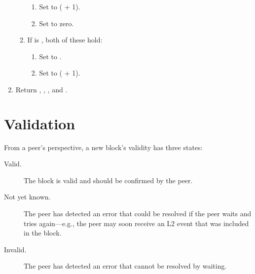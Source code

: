 \documentclass[../hydrozoa.tex]{subfiles}
\begin{document}
\begin{enumerate}
\begin{enumerate}
\begin{enumerate}
          \item Set  to ( + 1).
          \item Set  to zero.
        \end{enumerate}
      \item If  is , both of these hold:
        \begin{enumerate}
          \item Set  to .
          \item Set  to ( + 1).
        \end{enumerate}
    \end{enumerate}
  \item Return , , , and .
\end{enumerate}

\section{Validation}%
\label{h:l2-block-validation}%

From a peer's perspective, a new block's validity has three states:
\begin{description}
  \item[Valid.] The block is valid and should be confirmed by the peer.
  \item[Not yet known.] The peer has detected an error that could be resolved if the peer waits and tries again---e.g., the peer may soon receive an L2 event that was included in the block.
  \item[Invalid.] The peer has detected an error that cannot be resolved by waiting.
\end{description}
\end{document}
